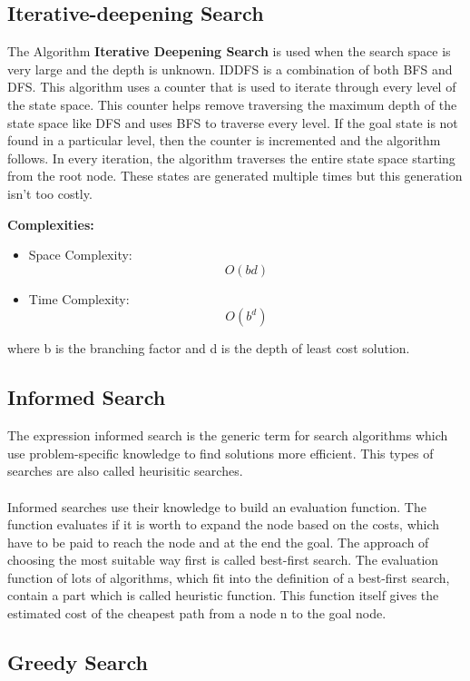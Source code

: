 \documentclass[11pt]{article}
\begin{document}
\subsection{Iterative-deepening Search}
The Algorithm \textbf{Iterative Deepening Search} is used when the search space is very large and the depth is unknown. IDDFS is a combination of both BFS and DFS. This algorithm uses a counter that is used to iterate through every level of the state space. This counter helps remove traversing the maximum depth of the state space like DFS and uses BFS to traverse every level. If the goal state is not found in a particular level, then the counter is incremented and the algorithm follows. In every iteration, the algorithm traverses the entire state space starting from the root node. These states are generated multiple times but this generation isn't too costly. 

\textbf{Complexities:}
\begin{itemize}
\item Space Complexity: \[O(bd)\]
\item Time Complexity: \[ O(b^d)\]
\end{itemize}
where b is the branching factor and d is the depth of least cost solution.

\subsection{Informed Search}
The expression informed search is the generic term for search algorithms which use problem-specific knowledge to find solutions more efficient. This types of searches are also called heurisitic searches. \\
\\
Informed searches use their knowledge to build an evaluation function. The function evaluates if it is worth to expand the node based on the costs, which have to be paid to reach the node and at the end the goal. The approach of choosing the most suitable way first is called best-first search. The evaluation function of lots of algorithms, which fit into the definition of a best-first search, contain a part which is called heuristic function. This function itself gives the estimated cost of the cheapest path from a node n to the goal node.

\subsection{Greedy Search}
\end{document}

